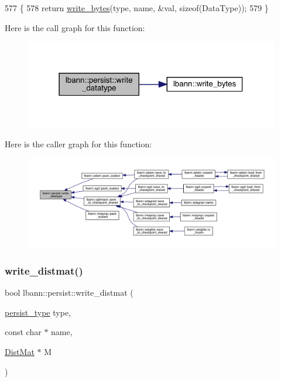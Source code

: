 \begin{DoxyCode}
577                                                                                    \{
578   \textcolor{keywordflow}{return} \hyperlink{classlbann_1_1persist_a8729c7c90f4ca3090cd678fce91a0eb0}{write\_bytes}(type, name, &val, \textcolor{keyword}{sizeof}(DataType));
579 \}
\end{DoxyCode}
Here is the call graph for this function\+:\nopagebreak
\begin{figure}[H]
\begin{center}
\leavevmode
\includegraphics[width=315pt]{classlbann_1_1persist_a5edc3f9cc3540b50d417993da2a6b5ce_cgraph}
\end{center}
\end{figure}
Here is the caller graph for this function\+:\nopagebreak
\begin{figure}[H]
\begin{center}
\leavevmode
\includegraphics[width=350pt]{classlbann_1_1persist_a5edc3f9cc3540b50d417993da2a6b5ce_icgraph}
\end{center}
\end{figure}
\mbox{\label{classlbann_1_1persist_a9170de652405d86d9ba9b3793f8781c6}} 
\subsubsection{\texorpdfstring{write\+\_\+distmat()}{write\_distmat()}}
{\footnotesize\ttfamily bool lbann\+::persist\+::write\+\_\+distmat (\begin{DoxyParamCaption}\item[{\hyperlink{namespacelbann_adee41f31f15f3906cbdcce4a1417eb56}{persist\+\_\+type}}]{type,  }\item[{const char $\ast$}]{name,  }\item[{\hyperlink{base_8hpp_a0fab5387556805cfeac3e7e567bf66c5}{Dist\+Mat} $\ast$}]{M }\end{DoxyParamCaption})}



